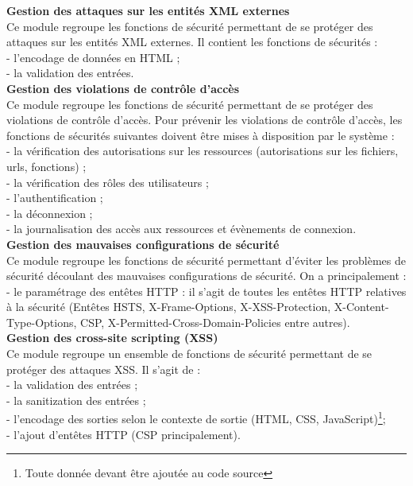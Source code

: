 \textbf{\RIGHTarrow Gestion des attaques sur les entités XML externes}\\
Ce module regroupe les fonctions de sécurité permettant de se protéger des attaques sur les entités XML externes. Il contient les fonctions de sécurités : \\
- l'encodage de données en HTML ; \\
- la validation des entrées.\\

\textbf{\RIGHTarrow Gestion des violations de contrôle d’accès}\\
Ce module regroupe les fonctions de sécurité permettant de se protéger des violations de contrôle d'accès. Pour prévenir les violations de contrôle d'accès, les fonctions de sécurités suivantes doivent être mises à disposition par le système : \\
- la vérification des autorisations sur les ressources (autorisations sur les fichiers, urls, fonctions) ; \\
- la vérification des rôles des utilisateurs ; \\
- l'authentification ; \\
- la déconnexion ; \\
- la journalisation des accès aux ressources et évènements de connexion.\\

\textbf{\RIGHTarrow Gestion des mauvaises configurations de sécurité}\\
Ce module regroupe les fonctions de sécurité permettant d'éviter les problèmes de sécurité découlant des mauvaises configurations de sécurité. On a principalement : \\
- le paramétrage des entêtes HTTP : il s'agit de toutes les entêtes HTTP relatives à la sécurité (Entêtes HSTS, X-Frame-Options, X-XSS-Protection, X-Content-Type-Options, CSP, X-Permitted-Cross-Domain-Policies entre autres). \\

\textbf{\RIGHTarrow Gestion des cross-site scripting (XSS)}\\
Ce module regroupe un ensemble de fonctions de sécurité permettant de se protéger des attaques XSS. Il s'agit de : \\
- la validation des entrées ;\\
- la sanitization des entrées ;\\
- l'encodage des sorties selon le contexte de sortie (HTML, CSS, JavaScript)\footnote{Toute donnée devant être ajoutée au code source}; \\
- l'ajout d'entêtes HTTP (CSP principalement).\\

